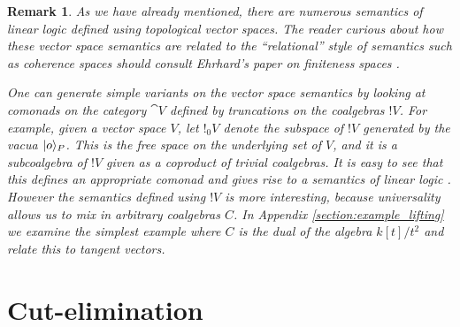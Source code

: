 \documentclass[english,letter paper,12pt,reqno]{article}
\DeclarePairedDelimiter\ket{\lvert}{\rangle}
\theoremstyle{example}
\newtheorem{remark}[theorem]{Remark}
\numberwithin{equation}{section}
\begin{document}
\begin{remark}\label{remark_otherpromotion} As we have already mentioned, there are numerous semantics of linear logic defined using topological vector spaces. The reader curious about how these vector space semantics are related to the ``relational'' style of semantics such as coherence spaces should consult Ehrhard's paper on finiteness spaces \cite{ehrhard}.

One can generate simple variants on the vector space semantics by looking at comonads on the category $\cat{V}$ defined by truncations on the coalgebras ${!} V$. For example, given a vector space $V$, let ${!}_0 V$ denote the subspace of ${!} V$ generated by the vacua $\ket{o}_P$. This is the free space on the underlying \emph{set} of $V$, and it is a subcoalgebra of ${!} V$ given as a coproduct of trivial coalgebras. It is easy to see that this defines an appropriate comonad and gives rise to a semantics of linear logic \cite[\S 4.3]{valiron}. However the semantics defined using ${!} V$ is more interesting, because universality allows us to mix in arbitrary coalgebras $C$. In Appendix \ref{section:example_lifting} we examine the simplest example where $C$ is the dual of the algebra $k[t]/t^2$ and relate this to tangent vectors.
\end{remark}

\section{Cut-elimination}\label{section:cut_elim}
\end{document}

